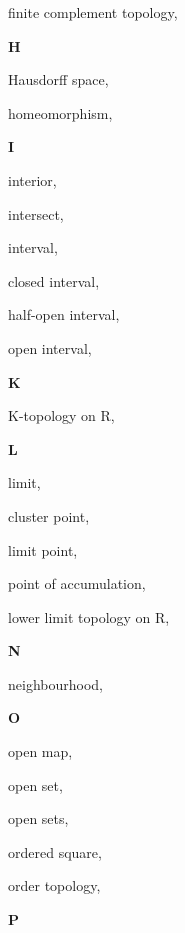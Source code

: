 \begin{multicols}{2}
finite complement topology, \pageref{def:FiniteComplementTopology}

\vspace{1em}\large{\textbf{H}}

Hausdorff space, \pageref{def:HausdorffSpace}

homeomorphism, \pageref{def:Homeomorphism}

\vspace{1em}\large{\textbf{I}}

interior, \pageref{def:Interior}

intersect, \pageref{def:Intersect}

interval, \pageref{def:Interval}

\hspace{1em}closed interval, \pageref{def:Interval}

\hspace{1em}half-open interval, \pageref{def:Interval}

\hspace{1em}open interval, \pageref{def:Interval}

\vspace{1em}\large{\textbf{K}}

K-topology on R, \pageref{def:KTopologyOnTheRealLine}

\vspace{1em}\large{\textbf{L}}

limit, \pageref{def:Limit}

cluster point, \pageref{def:LimitPoint}

limit point, \pageref{def:LimitPoint}

point of accumulation, \pageref{def:LimitPoint}

lower limit topology on R, \pageref{def:LowerLimitTopologyOnTheRealLine}

\vspace{1em}\large{\textbf{N}}

neighbourhood, \pageref{def:Neighbourhood}

\vspace{1em}\large{\textbf{O}}

open map, \pageref{def:OpenMap}

open set, \pageref{def:OpenSet}

open sets, \pageref{def:OpenSets}

ordered square, \pageref{def:OrderedSquare}

order topology, \pageref{def:OrderTopology}

\vspace{1em}\large{\textbf{P}}


\end{multicols}
